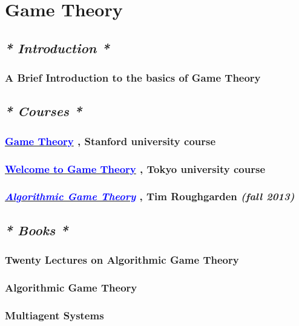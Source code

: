 \documentclass[12pt, a4paper]{article}
\begin{document}
\section{Game Theory}
\subsection*{\emph{* Introduction  *}}
\subsubsection*{A Brief Introduction to the basics of Game Theory}

\subsection*{\emph{* Courses *}}
\subsubsection*{\href{https://www.coursera.org/learn/game-theory-1}{\textcolor{blue}{Game Theory}} , Stanford university course}
\subsubsection*{\href{https://www.coursera.org/learn/game-theory-introduction}{\textcolor{blue}{Welcome to Game Theory}} , Tokyo university course}
\subsubsection*{\href{http://timroughgarden.org/f13/f13.html}{\emph{\textcolor{blue}{Algorithmic Game Theory}}} , Tim Roughgarden \emph{(fall 2013)}}

\subsection*{\emph{* Books *}}
\subsubsection*{Twenty Lectures on Algorithmic Game Theory}
\subsubsection*{Algorithmic Game Theory}
\subsubsection*{Multiagent Systems}
\end{document}
